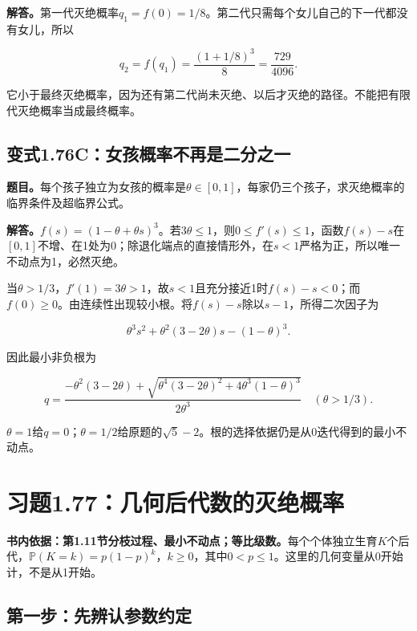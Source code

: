 \documentclass[
  11pt,a4paper,UTF8,fontset=fandol]{ctexart}
\begin{document}
\textbf{解答。}第一代灭绝概率\(q_1=f(0)=1/8\)。第二代只需每个女儿自己的下一代都没有女儿，所以

\[\boxed{q_2=f(q_1)=\frac{(1+1/8)^3}{8}=\frac{729}{4096}.}\]

它小于最终灭绝概率，因为还有第二代尚未灭绝、以后才灭绝的路径。不能把有限代灭绝概率当成最终概率。

\subsection{变式1.76C：女孩概率不再是二分之一}\label{ux53d8ux5f0f1.76cux5973ux5b69ux6982ux7387ux4e0dux518dux662fux4e8cux5206ux4e4bux4e00}

\textbf{题目。}每个孩子独立为女孩的概率是\(\theta\in[0,1]\)，每家仍三个孩子，求灭绝概率的临界条件及超临界公式。

\textbf{解答。}\(f(s)=(1-\theta+\theta s)^3\)。若\(3\theta\le1\)，则\(0\le f'(s)\le1\)，函数\(f(s)-s\)在\([0,1]\)不增、在1处为0；除退化端点的直接情形外，在\(s<1\)严格为正，所以唯一不动点为1，必然灭绝。

当\(\theta>1/3\)，\(f'(1)=3\theta>1\)，故\(s<1\)且充分接近1时\(f(s)-s<0\)；而\(f(0)\ge0\)。由连续性出现较小根。将\(f(s)-s\)除以\(s-1\)，所得二次因子为

\[\theta^3s^2+\theta^2(3-2\theta)s-(1-\theta)^3.\]

因此最小非负根为

\[\boxed{q=\frac{-\theta^2(3-2\theta)+\sqrt{\theta^4(3-2\theta)^2+4\theta^3(1-\theta)^3}}{2\theta^3}
\quad(\theta>1/3).}\]

\(\theta=1\)给\(q=0\)；\(\theta=1/2\)给原题的\(\sqrt5-2\)。根的选择依据仍是从0迭代得到的最小不动点。

\section{习题1.77：几何后代数的灭绝概率}\label{ux4e60ux98981.77ux51e0ux4f55ux540eux4ee3ux6570ux7684ux706dux7eddux6982ux7387}

\textbf{书内依据：第1.11节分枝过程、最小不动点；等比级数。}每个个体独立生育\(K\)个后代，\(\mathbb P(K=k)=p(1-p)^k\)，\(k\ge0\)，其中\(0<p\le1\)。这里的几何变量从0开始计，不是从1开始。

\subsection{第一步：先辨认参数约定}\label{ux7b2cux4e00ux6b65ux5148ux8fa8ux8ba4ux53c2ux6570ux7ea6ux5b9a}
\end{document}
